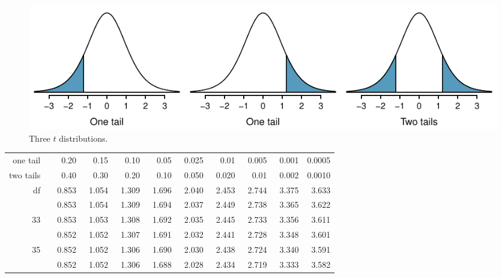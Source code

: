 \begin{figure}[h]
\centering
\includegraphics[width=\textwidth]{extraTeX/appendix/figures/tTails/tTails}
\caption{Three $t$ distributions.}
\label{tTails}
\end{figure}


\begin{center}
\begin{tabular}{r | rrr rr rrrr}
\hline
one tail & \hspace{1.5mm}  0.20  &   0.15  &   0.10  &   0.05  &   0.025 &   0.01  &   0.005 &   0.001 &   0.0005 \\
two tails & \hspace{1.5mm}  0.40  &   0.30  &   0.20  &   0.10  &   0.050 &   0.020  &   0.01 &   0.002 &   0.0010\\
\hline
df \quad        31	&	~0.853	&	~1.054	&	~1.309	&	~1.696	&	~2.040	&	~2.453	&	~2.744	&	~3.375	&	~3.633	\\
\gray   32	&	~0.853	&	~1.054	&	~1.309	&	~1.694	&	~2.037	&	~2.449	&	~2.738	&	~3.365	&	~3.622	\\
        33	&	~0.853	&	~1.053	&	~1.308	&	~1.692	&	~2.035	&	~2.445	&	~2.733	&	~3.356	&	~3.611	\\
\gray   34  &	~0.852	&	~1.052	&	~1.307	&	~1.691	&	~2.032	&	~2.441	&	~2.728	&	~3.348	&	~3.601	\\
        35	&	~~0.852	&	~1.052	&	~1.306	&	~1.690	&	~2.030	&	~2.438	&	~2.724	&	~3.340	&	~3.591	\\
\hline
\gray   36	&	~0.852	&	~1.052	&	~1.306	&	~1.688	&	~2.028	&	~2.434	&	~2.719	&	~3.333	&	~3.582	\\

\end{tabular}
\end{center}
